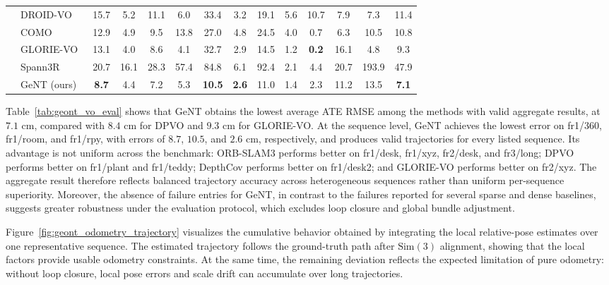 \begin{table}[!t]
\begin{tabular*}{\textwidth}{@{\extracolsep{\fill}}cl|cccccccc|cc|c|c@{}}
        & DROID-VO~\cite{teed2021droid} & 15.7 & 5.2 & 11.1 & 6.0 & 33.4 & 3.2 & 19.1 & 5.6 & 10.7 & 7.9 & 7.3 & 11.4 \\
        & COMO~\cite{dexheimer2024compact} & 12.9 & 4.9 & 9.5 & 13.8 & 27.0 & 4.8 & 24.5 & 4.0 & 0.7 & 6.3 & 10.5 & 10.8 \\
        & GLORIE-VO~\cite{zhang2024glorie} & 13.1 & \cellcolor{yellow!25}4.0 & 8.6 & \cellcolor{yellow!25}4.1 & 32.7 & \cellcolor{yellow!25}2.9 & 14.5 & \cellcolor{yellow!25}1.2 & \cellcolor{red!25}\textbf{0.2} & 16.1 & 4.8 & 9.3 \\
        & Spann3R~\cite{wang20253d} & 20.7 & 16.1 & 28.3 & 57.4 & 84.8 & 6.1 & 92.4 & 2.1 & 4.4 & 20.7 & 193.9 & 47.9 \\
        & GeNT (ours) & \cellcolor{red!25}\textbf{8.7} & 4.4 & 7.2 & 5.3 & \cellcolor{red!25}\textbf{10.5} & \cellcolor{red!25}\textbf{2.6} & \cellcolor{yellow!25}11.0 & 1.4 & 2.3 & 11.2 & 13.5 & \cellcolor{red!25}\textbf{7.1} \\
        \bottomrule
    \end{tabular*}
\end{table}

Table~\ref{tab:geont_vo_eval} shows that GeNT obtains the lowest average ATE RMSE among the methods with valid aggregate results, at $7.1$ cm, compared with $8.4$ cm for DPVO and $9.3$ cm for GLORIE-VO.
At the sequence level, GeNT achieves the lowest error on fr1/360, fr1/room, and fr1/rpy, with errors of $8.7$, $10.5$, and $2.6$ cm, respectively, and produces valid trajectories for every listed sequence.
Its advantage is not uniform across the benchmark: ORB-SLAM3 performs better on fr1/desk, fr1/xyz, fr2/desk, and fr3/long; DPVO performs better on fr1/plant and fr1/teddy; DepthCov performs better on fr1/desk2; and GLORIE-VO performs better on fr2/xyz.
The aggregate result therefore reflects balanced trajectory accuracy across heterogeneous sequences rather than uniform per-sequence superiority.
Moreover, the absence of failure entries for GeNT, in contrast to the failures reported for several sparse and dense baselines, suggests greater robustness under the evaluation protocol, which excludes loop closure and global bundle adjustment.

Figure~\ref{fig:geont_odometry_trajectory} visualizes the cumulative behavior obtained by integrating the local relative-pose estimates over one representative sequence.
The estimated trajectory follows the ground-truth path after $\mathrm{Sim}(3)$ alignment, showing that the local factors provide usable odometry constraints.
At the same time, the remaining deviation reflects the expected limitation of pure odometry: without loop closure, local pose errors and scale drift can accumulate over long trajectories.

